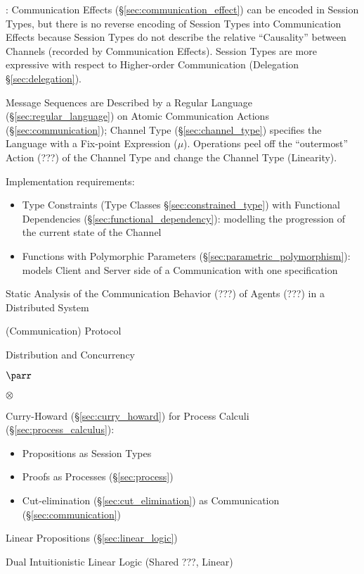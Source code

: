\cite{orchard-yoshida16}: Communication Effects
(\S\ref{sec:communication_effect}) can be encoded in Session Types,
but there is no reverse encoding of Session Types into Communication
Effects because Session Types do not describe the relative
``Causality'' between Channels (recorded by Communication Effects).
Session Types are more expressive with respect to Higher-order
Communication (Delegation \S\ref{sec:delegation}).

Message Sequences are Described by a Regular Language
(\S\ref{sec:regular_language}) on Atomic Communication Actions
(\S\ref{sec:communication}); Channel Type (\S\ref{sec:channel_type})
specifies the Language with a Fix-point Expression ($\mu$). Operations
peel off the ``outermost'' Action (???) of the Channel Type and change
the Channel Type (Linearity). \cite{neubauer-thiemann04}

Implementation requirements: \cite{neubauer-thiemann04}
\begin{itemize}
  \item Type Constraints (Type Classes \S\ref{sec:constrained_type})
    with Functional Dependencies (\S\ref{sec:functional_dependency}):
    modelling the progression of the current state of the Channel
  \item Functions with Polymorphic Parameters
    (\S\ref{sec:parametric_polymorphism}): models Client and Server
    side of a Communication with one specification
\end{itemize}

Static Analysis of the Communication Behavior (???) of Agents (???) in
a Distributed System \cite{gay-vasconcelos10}

(Communication) Protocol

Distribution and Concurrency

$\parr$

$\otimes$

Curry-Howard (\S\ref{sec:curry_howard}) for Process Calculi
(\S\ref{sec:process_calculus}):
\begin{itemize}
  \item Propositions as Session Types
  \item Proofs as Processes (\S\ref{sec:process})
  \item Cut-elimination (\S\ref{sec:cut_elimination}) as Communication
    (\S\ref{sec:communication})
\end{itemize}

Linear Propositions (\S\ref{sec:linear_logic})

Dual Intuitionistic Linear Logic \cite{caires-pfenning10} (Shared ???,
Linear)

